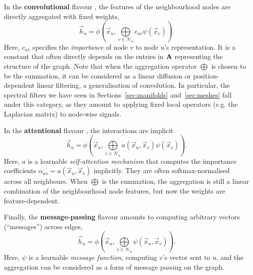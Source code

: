 In the \textbf{convolutional} flavour \citep{kipf2016semi,defferrard2016convolutional,wu2019simplifying}, the features of the neighbourhood nodes are  directly aggregated with fixed weights,
\begin{equation}
    \vec{h}_u = \phi\left(\vec{x}_u, \bigoplus\limits_{v\in\mathcal{N}_u}c_{uv}\psi(\vec{x}_v)\right).
\end{equation}
Here, $c_{uv}$ specifies the \emph{importance} of node $v$ to node $u$'s representation. It is a constant that often directly depends on the entries in ${\bf A}$ representing the structure of the graph. 
%
Note that when the aggregation operator $\bigoplus$ is chosen to be the summation, it can be considered as a linear diffusion or position-dependent linear filtering, a generalisation of convolution. 
%
In particular, the spectral filters we have seen in Sections~\ref{sec:manifolds} and~\ref{sec:meshes} fall under this category, as they amount to applying fixed local operators (e.g. the Laplacian matrix) to node-wise signals.  
 
 

In the \textbf{attentional} flavour \citep{velickovic2018graph,monti2017geometric,zhang2018gaan}, the interactions are implicit 
\begin{equation}
    \vec{h}_u = \phi\left(\vec{x}_u, \bigoplus\limits_{v\in\mathcal{N}_u}a(\vec{x}_u, \vec{x}_v)\psi(\vec{x}_v)\right).
\end{equation}
Here, $a$ is a learnable \emph{self-attention mechanism}  that computes the importance coefficients $\alpha_{uv} = a(\vec{x}_u, \vec{x}_v)$ implicitly. They are often softmax-normalised across all neighbours. 
%
When $\bigoplus$ is the summation, the aggregation is still a linear combination of the neighbourhood node features, but now the weights are feature-dependent. 


Finally, the \textbf{message-passing} flavour \citep{gilmer2017neural,battaglia2018relational} amounts to computing arbitrary vectors (``messages'') across edges, 
\begin{equation}
    \vec{h}_u = \phi\left(\vec{x}_u, \bigoplus\limits_{v\in\mathcal{N}_u}\psi(\vec{x}_u, \vec{x}_v)\right).
\end{equation}
Here, $\psi$ is a learnable \emph{message function}, computing $v$'s vector sent to $u$, and the aggregation can be considered as a form of message passing on the graph.


